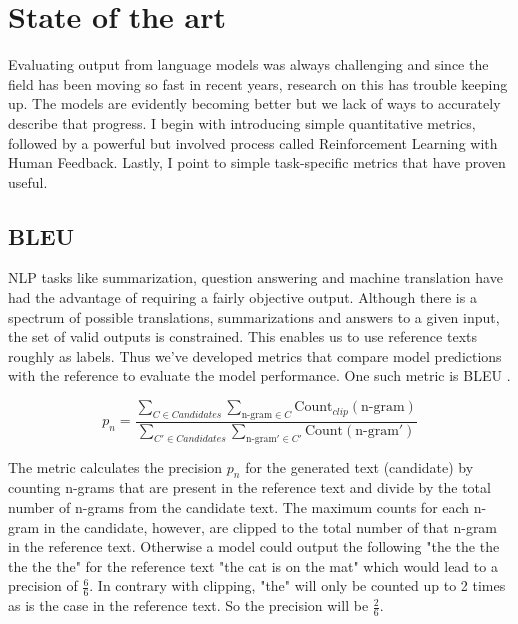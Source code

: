 \section{State of the art} \label{sec:body_state_of_the_art}
Evaluating output from language models was always challenging and since the field has been moving so fast in recent years, research on this has trouble keeping up. The models are evidently becoming better but we lack of ways to accurately describe that progress. I begin with introducing simple quantitative metrics, followed by a powerful but involved process called Reinforcement Learning with Human Feedback. Lastly, I point to simple task-specific metrics that have proven useful. 

\subsection{BLEU}
NLP tasks like summarization, question answering and machine translation have had the advantage of requiring a fairly objective output. Although there is a spectrum of possible translations, summarizations and answers to a given input, the set of valid outputs is constrained. This enables us to use reference texts roughly as labels. Thus we've developed metrics that compare model predictions with the reference to evaluate the model performance. One such metric is BLEU \cite{papineni2002bleu}.  

\begin{equation}
p_n = \frac{\sum_{C \in Candidates} \sum_{\text{n-gram} \in C}\text{Count}_{clip}(\text{n-gram})}{\sum_{C' \in Candidates} \sum_{\text{n-gram}' \in C'}\text{Count}(\text{n-gram}')}
\end{equation}

The metric calculates the precision $p_n$ for the generated text (candidate) by counting n-grams that are present in the reference text and divide by the total number of n-grams from the candidate text. The maximum counts for each n-gram in the candidate, however, are clipped to the total number of that n-gram in the reference text. Otherwise a model could output the following "the the the the the the" for the reference text "the cat is on the mat" which would lead to a precision of $\frac{6}{6}$. In contrary with clipping, "the" will only be counted up to 2 times as is the case in the reference text. So the precision will be $\frac{2}{6}$.

